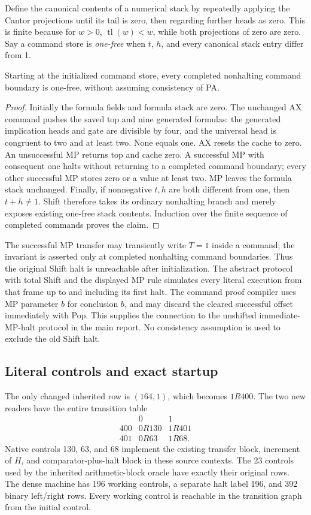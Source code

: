 Define the canonical contents of a numerical stack by repeatedly
applying the Cantor projections until its tail is zero, then regarding
further heads as zero. This is finite because for $w>0$,
$\operatorname{tl}(w)<w$, while both projections of zero are zero.
Say a command store is \emph{one-free} when $t$, $h$, and every canonical
stack entry differ from 1.

\begin{lemma}
Starting at the initialized command store, every completed nonhalting
command boundary is one-free, without assuming consistency of PA.
\end{lemma}
\begin{proof}
Initially the formula fields and formula stack are zero. The unchanged
AX command pushes the saved top and nine generated formulas: the
generated implication heads and gate are divisible by four, and the
universal head is congruent to two and at least two. None equals one.
AX resets the cache to zero. An unsuccessful MP returns top and cache
zero. A successful MP with consequent one halts without returning to a
completed command boundary; every other successful MP stores zero or
a value at least two. MP
leaves the formula stack unchanged. Finally, if nonnegative $t,h$
are both different from one, then $t+h\ne1$. Shift therefore takes
its ordinary nonhalting branch and merely exposes existing one-free
stack contents. Induction over the finite sequence of completed commands proves
the claim.
\end{proof}

The successful MP transfer may transiently write $T=1$ inside a command;
the invariant is asserted only at completed nonhalting command boundaries.
Thus the original Shift halt is unreachable after initialization. The
abstract protocol with total Shift and the displayed MP rule simulates
every literal execution from that frame up to and including its first
halt. The command proof compiler uses MP parameter $b$ for conclusion
$b$, and may discard the cleared successful offset immediately with
Pop. This supplies the connection to the unshifted immediate-MP-halt
protocol in the main report. No consistency assumption is used to
exclude the old Shift halt.

\subsection{Literal controls and exact startup}

The only changed inherited row is $(164,1)$, which becomes $1R400$.
The two new readers have the entire transition table
\[
\begin{array}{c|cc}
 &0&1\\\hline
400&0R130&1R401\\
401&0R63&1R68.
\end{array}
\]
Native controls 130, 63, and 68 implement the existing transfer block,
increment of $H$, and comparator-plus-halt block in these source
contexts. The 23 controls used by the inherited arithmetic-block
oracle have exactly their original rows.
The dense machine has 196 working controls, a separate halt label 196,
and 392 binary left/right rows. Every working control is reachable in
the transition graph from the initial control.

